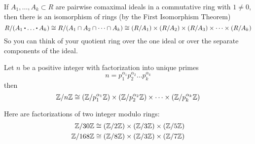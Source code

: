 \documentclass[../Main.tex]{subfiles}
\begin{document}
\begin{crl}[title= Isomorphisms of quotient rings by product of ideals]
	If $A_1,\dots,A_k\subset R$ are pairwise comaximal ideals in a commutative ring with $1\ne 0$, then there is an isomorphism of rings (by the First Isomorphism Theorem)
	\[R/(A_1\rdot \dots\rdot A_k)\cong R/(A_1\cap A_2\cap \dots \cap A_k) \cong (R/A_1)\times (R/A_2)\times (R/A_3)\times\dots\times(R/A_k)\]
	So you can think of your quotient ring over the one ideal or over the separate components of the ideal.
\end{crl}
\begin{crl}[title = \texorpdfstring{$\modZ{n}$}{Z/nZ} isomorphic to quotients by prime factors]
	Let $n$ be a positive integer with factorization into unique primes \[n=p_1^{\alpha_1} p_2^{\alpha_2}\dots p_k^{\alpha_k}\]
	then
	\[\mathbb{Z}/n\mathbb{Z} \cong (\mathbb{Z}/p_1^{\alpha_1}\mathbb{Z})\times (\mathbb{Z}/p_2^{\alpha_2}\mathbb{Z})\times \dots \times (\mathbb{Z}/p_k^{\alpha_k}\mathbb{Z})\]
\end{crl}
\begin{example} Here are factorizations of two integer modulo rings:
	\begin{align*}
	\mathbb{Z}/30\mathbb{Z}&\cong (\mathbb{Z}/2\mathbb{Z})\times(\mathbb{Z}/3\mathbb{Z})\times(\mathbb{Z}/5\mathbb{Z})\\
	\mathbb{Z}/168\mathbb{Z}&\cong (\mathbb{Z}/8\mathbb{Z})\times(\mathbb{Z}/3\mathbb{Z})\times(\mathbb{Z}/7\mathbb{Z})
	\end{align*}
\end{example}
\end{document}
